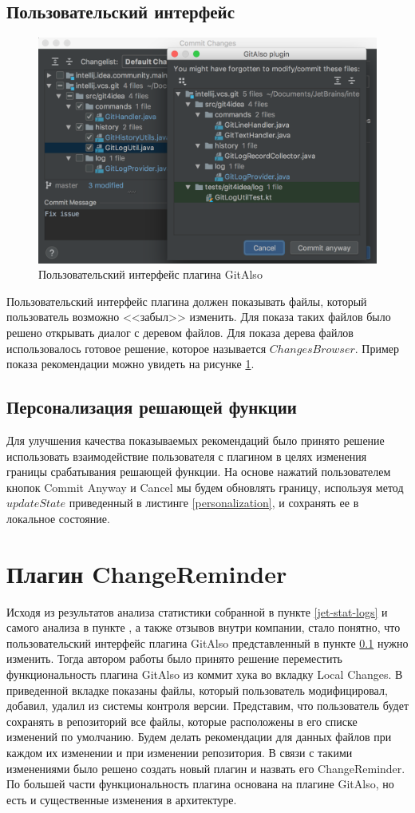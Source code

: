 \documentclass[times]{itmo-student-thesis}
\begin{document}
\subsection{Пользовательский интерфейс}\label{git-also-ui}
\begin{figure}[!h]
\caption{Пользовательский интерфейс плагина GitAlso}\label{git-also-screen}
\centering
\includegraphics[scale=0.6]{GitAlso.png}
\end{figure}
Пользовательский интерфейс плагина должен показывать файлы, который пользователь возможно <<забыл>> изменить. Для показа таких файлов было решено открывать диалог с деревом файлов. Для показа дерева файлов использовалось готовое решение, которое называется $ChangesBrowser$. Пример показа рекомендации можно увидеть на рисунке  \ref{git-also-screen}.
\subsection{Персонализация решающей функции}
Для улучшения качества показываемых рекомендаций было принято решение использовать взаимодействие пользователя с плагином в целях изменения границы срабатывания решающей функции. На основе нажатий пользователем кнопок Commit Anyway и Cancel мы будем обновлять границу, используя метод $updateState$ приведенный в листинге \ref{personalization}, и сохранять ее в локальное состояние.
\section{Плагин ChangeReminder}
Исходя из результатов анализа статистики собранной в пункте \ref{jet-stat-logs} и самого анализа в пункте
, а также отзывов внутри компании, стало понятно, что пользовательский интерфейс плагина GitAlso представленный в пункте \ref{git-also-ui} нужно изменить. Тогда автором работы было принято решение переместить функциональность плагина GitAlso из коммит хука во вкладку Local Changes. В приведенной вкладке показаны файлы, который пользователь модифицировал, добавил, удалил из системы контроля версии. Представим, что пользователь будет сохранять в репозиторий все файлы, которые расположены в его списке изменений по умолчанию. Будем делать рекомендации для данных файлов при каждом их изменении и при изменении репозитория. В связи с такими изменениями было решено создать новый плагин и назвать его ChangeReminder. По большей части функциональность плагина основана на плагине GitAlso, но есть и существенные изменения в архитектуре.
\end{document}
